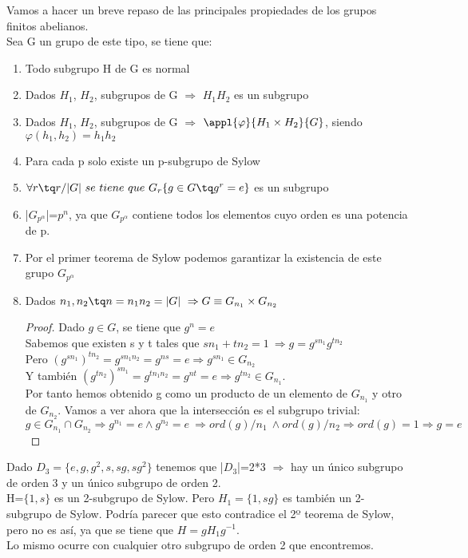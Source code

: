 \documentclass[nochap]{apuntes}
\begin{document}
  Vamos a hacer un breve repaso de las principales propiedades de los grupos finitos abelianos.\\
  Sea G un grupo de este tipo, se tiene que:\\
  \begin{enumerate}
   \item Todo subgrupo H de G es normal
   \item Dados $H_1$,  $H_2$, subgrupos de G $\Rightarrow$  $H_1H_2$  es un subgrupo
   \item Dados $H_1$,  $H_2$, subgrupos de G $\Rightarrow$ $\appl{\varphi}{H_1\times H_2}{G}$, siendo $\varphi(h_1,h_2)=h_1h_2$
   \item Para cada p solo existe un p-subgrupo de Sylow
   \item $\forall r \tq r / |G| \ se \ tiene \ que \ G_r\{g \in G \tq g^{r}=e\}$  es un subgrupo
   \item |$G_{p^{\alpha}}$|=$p^{n}$, ya que $G_{p^{\alpha}}$  contiene todos los elementos cuyo orden es una potencia de p.
   \item Por el primer teorema de Sylow podemos garantizar la existencia de este grupo $G_{p^{\alpha}}$
   \item Dados $n_1, n_2 \tq n=n_1n_2=|G| \ \Rightarrow G \equiv G_{n_1}\times G_{n_2}$
   \begin{proof}
    Dado $g \in G$, se tiene que $g^{n}=e$\\
    Sabemos que existen s y t tales que $sn_1+tn_2=1 \ \Rightarrow g=g^{sn_1}g^{tn_2}$\\
    Pero $(g^{sn_1})^{tn_2}=g^{sn_1n_2}=g^{ns}=e \Rightarrow g^{sn_1}\in G_{n_2}$\\
    Y también $(g^{tn_2})^{sn_1}=g^{tn_1n_2}=g^{nt}=e \Rightarrow g^{tn_2}\in G_{n_1}$.\\
    Por tanto hemos obtenido g como un producto de un elemento de $G_{n_1}$  y otro de $G_{n_2}$. Vamos a ver ahora que la intersección
    es el subgrupo trivial:\\
    $g\in G_{n_1} \cap G_{n_2} \Rightarrow g^{n_1}=e \wedge g^{n_2}=e \ \Rightarrow ord(g)/n_1 \ \wedge ord(g)/n_2 \Rightarrow ord(g)=1 \Rightarrow g=e$
   \end{proof}
  \end{enumerate}

\begin{example}
 Dado $D_3=\{e,g,g^{2},s, sg, sg^{2}\}$  tenemos que |$D_3$|=2*3 $\Rightarrow$  hay un único subgrupo de orden 3 y un único subgrupo de
 orden 2.\\
 H=$\{1, s\}$  es un 2-subgrupo de Sylow. Pero $H_1=\{1, sg\}$  es también un 2-subgrupo de Sylow. Podría parecer que esto contradice
 el 2º teorema de Sylow, pero no es así, ya que se tiene que $H=gH_1g^{-1}$.\\
 Lo mismo ocurre con cualquier otro subgrupo de orden 2 que encontremos.
\end{example}
\end{document}
